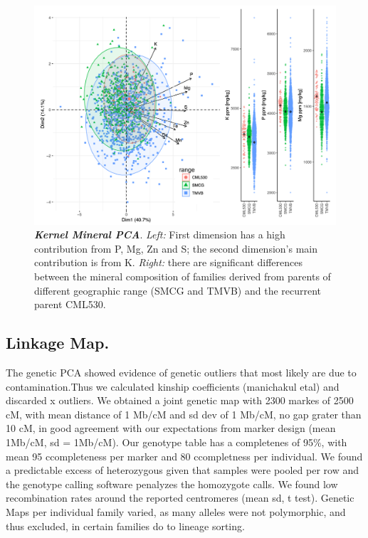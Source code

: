 \begin{figure}[!ht]
\begin{centering}
\includegraphics[width=\textwidth]{Chapter-4/figs/mineral_PCA.png}
\caption[Kernel Mineral PCA]{\textit{\textbf{Kernel Mineral PCA}}. \textit{Left:} First dimension has a high contribution from P, Mg, Zn and S; the second dimension's main contribution is from K.  \textit{Right:} there are significant differences between the mineral composition of families derived from parents of different geographic range (SMCG and TMVB) and the recurrent parent CML530.}
\end{centering}
\label{mineralPCA}
\end{figure}
\clearpage

\subsection{Linkage Map.}
The genetic PCA showed evidence of genetic outliers that most likely are due to contamination.Thus we calculated kinship coefficients (manichakul etal) and discarded x outliers.
We obtained a joint genetic map with 2300 markes of 2500 cM, with mean distance of 1 Mb/cM and sd dev of 1 Mb/cM, no gap grater than 10 cM, in good agreement with our expectations from marker design (mean 1Mb/cM, sd = 1Mb/cM).
Our genotype table has a completenes of 95\%, with mean 95 ccompleteness per marker and 80 ccompletness per individual.
We found a predictable excess of heterozygous given that samples were pooled per row and the genotype calling software penalyzes the homozygote calls.  We found low recombination rates around the reported centromeres (mean sd, t test).
Genetic Maps per individual family varied, as  many alleles were not  polymorphic, and thus excluded, in certain families do to lineage sorting.



